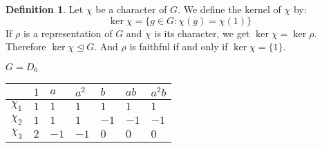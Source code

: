 \documentclass[11pt, notitlepage]{article}
\numberwithin{equation}{section}
\theoremstyle{plain}
\theoremstyle{definition}
\newtheorem{definition}[theorem]{Definition}
\newenvironment{example}
	{\pushQED{\qed}\renewcommand{\qedsymbol}{$\blacktriangleleft$}\examplex}
	{\popQED\endexamplex}
\begin{document}
\begin{definition}
	Let $\chi$ be a character of $G$. We define the kernel of $\chi$ by:
	\[
	\ker\chi = \{g\in G:\chi(g) = \chi(1)\}
	\]
	If $\rho$ is a representation of $G$ and $\chi$ is its character, we get $\ker\chi = \ker\rho$. Therefore $\ker\chi\unlhd G$. And $\rho$ is faithful if and only if $\ker\chi = \{1\}$.
\end{definition}
\begin{example}
	$G = D_6$

\begin{tabular}{l|l|l|l|l|l|l|}
	& $1$ & $a$  & $a^2$ & $b$  & $ab$ & $a^2b$  \\ 
	\hline
	$\chi_1$ & $1$ & $1$  & $1$   & $1$  & $1$  & $1$     \\ 
	\hline
	$\chi_2$ & $1$ & $1$  & $1$   & $-1$ & $-1$ & $-1$    \\ 
	\hline
	$\chi_3$ & $2$ & $-1$ & $-1$  & $0$  & $0$  & $0$     \\
	\hline
\end{tabular}

\end{example}
\end{document}

